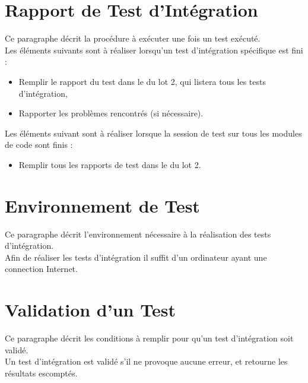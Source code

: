   \section{Rapport de Test d'Intégration}  
  	Ce paragraphe décrit la procédure à exécuter une fois un test exécuté.  \\
  	
  	Les éléments suivants sont à réaliser lorsqu'un test d'intégration spécifique est fini : 
  	\begin{itemize}
  		\item Remplir le rapport du test dans le \JTI du lot 2, qui listera tous les tests d'intégration,
  		\item Rapporter les problèmes rencontrés (si nécessaire).
  	\end{itemize}
  	
  	Les éléments suivant sont à réaliser lorsque la session de test sur tous les modules de code sont finis : 
  	\begin{itemize}
  		\item Remplir tous les rapports de test dans le \JTI du lot 2.
  	\end{itemize}
  
  \section{Environnement de Test}
	  Ce paragraphe décrit l'environnement nécessaire à la réalisation des tests d'intégration. \\
	  
	  Afin de réaliser les tests d'intégration il suffit d'un ordinateur ayant une connection Internet.
  
  \section{Validation d'un Test}
	Ce paragraphe décrit les conditions à remplir pour qu'un test d'intégration soit validé.\\
  
  	Un test d'intégration est validé s'il ne provoque aucune erreur, et retourne les résultats escomptés. 
  	
  	